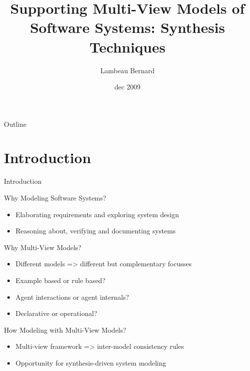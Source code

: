 \documentclass[11pt]{beamer}
\title{Supporting Multi-View Models of Software Systems: Synthesis Techniques}
\author{Lambeau Bernard}
\institute{UCL/EPL/INGI}
\date{dec 2009}
\begin{document}
	\begin{frame}
	    \titlepage 
	\end{frame}

	\begin{frame}{Outline}
		\small
		\tableofcontents
	\end{frame} 

\section{Introduction} 
\begin{frame}{Introduction} 
  \begin{block}{Why Modeling Software Systems?}
    \begin{itemize}
      \item Elaborating requirements and exploring system design \cite{AVL09}
      \item Reasoning about, verifying and documenting systems
    \end{itemize}
  \end{block}
  \begin{block}{Why Multi-View Models?}
    \begin{itemize}
      \item Different models => different but complementary focusses
      \item Example based or rule based? 
      \item Agent interactions or agent internals?
      \item Declarative or operational? 
    \end{itemize}
  \end{block}
  \begin{block}{How Modeling with Multi-View Models?}
    \begin{itemize}
      \item Multi-view framework => inter-model consistency rules
      \item Opportunity for synthesis-driven system modeling 
    \end{itemize}
  \end{block}
\end{frame}
\end{document}
